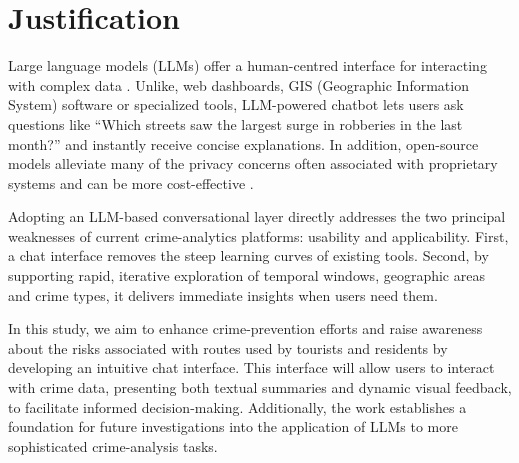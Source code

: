 \section{Justification}



Large language models (LLMs) offer a human-centred interface for interacting with complex data \cite{Yang2024HumanAIInteraction} \cite{Pappula2023LLMsFC}. Unlike, web dashboards, GIS (Geographic Information System) software or specialized tools, LLM-powered chatbot lets users ask questions like ``Which streets saw the largest surge in robberies in the last month?'' and instantly receive concise explanations. In addition, open-source models alleviate many of the privacy concerns often associated with proprietary systems and can be more cost-effective \cite{Liu2024NLDriven}. 


Adopting an LLM-based conversational layer directly addresses the two principal weaknesses of current crime-analytics platforms: usability and applicability. First, a chat interface removes the steep learning curves of existing tools. Second, by supporting rapid, iterative exploration of temporal windows, geographic areas and crime types, it delivers immediate insights when users need them.

In this study, we aim to enhance crime-prevention efforts and raise awareness about the risks associated with routes used by tourists and residents by developing an intuitive chat interface. This interface will allow users to interact with crime data, presenting both textual summaries and dynamic visual feedback, to facilitate informed decision-making. Additionally, the work establishes a foundation for future investigations into the application of LLMs to more sophisticated crime-analysis tasks. %

